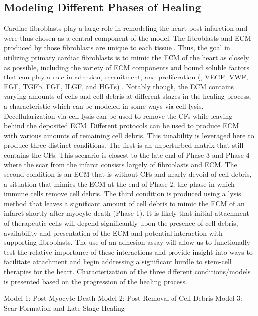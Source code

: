 \subsection{Modeling Different Phases of Healing}
Cardiac fibroblasts play a large role in remodeling the heart post infarction and were thus chosen as a central component of the model. The fibroblasts and ECM produced by those fibroblasts are unique to each tissue \cite{Chang:2002ij,Fries:1994tg,Lekic:1997hc,Souders:2009kl,Chang:2002ij}. Thus, the goal in utilizing primary cardiac fibroblasts is to mimic the ECM of the heart as closely as possible, including the variety of ECM components and bound soluble factors that can play a role in adhesion, recruitment, and proliferation (\eg, VEGF, VWF, EGF, TGFb, FGF, ILGF, and HGFs) \cite{Franitza:2000fu,Hynes:2009bs,Iyer:2008fv,Vaday:2000kl,Vaday:2000dz}. Notably though, the ECM contains varying amounts of cells and cell debris at different stages in the healing process, a characteristic which can be modeled in some ways via cell lysis. Decellularization via cell lysis can be used to remove the CFs while leaving behind the deposited ECM. Different protocols can be used to produce ECM with various amounts of remaining cell debris. This tunability is leveraged here to produce three distinct conditions. The first is an unperturbed matrix that still contains the CFs. This scenario is closest to the late end of Phase 3 and Phase 4 where the scar from the infarct consists largely of fibroblasts and ECM. The second condition is an ECM that is without CFs and nearly devoid of cell debris, a situation that mimics the ECM at the end of Phase 2, the phase in which immune cells remove cell debris. The third condition is produced using a lysis method that leaves a significant amount of cell debris to mimic the ECM of an infarct shortly after myocyte death (Phase 1). It is likely that initial attachment of therapeutic cells will depend significantly upon the presence of cell debris, availability and presentation of the ECM and potential interaction with supporting fibroblasts. The use of an adhesion assay will allow us to functionally test the relative importance of these interactions and provide insight into ways to facilitate attachment and begin addressing a significant hurdle to stem-cell therapies for the heart. Characterization of the three different conditions\slash models is presented based on the progression of the healing process.

\begin{outline}
\1 Model 1: Post Myocyte Death
\1 Model 2: Post Removal of Cell Debris
\1 Model 3: Scar Formation and Late-Stage Healing
\end{outline}

